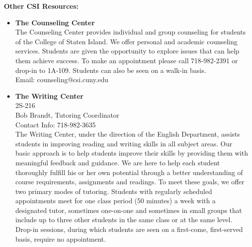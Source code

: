 \documentclass[11pt]{article}
\begin{document}
\textbf{Other CSI Resources:}
\begin{itemize}
    \item \textbf{The Counseling Center} \\
    The Counseling Center provides individual and group counseling for students of the College of Staten Island. We offer personal and academic counseling services. Students are given the opportunity to explore issues that can help them achieve success. To make an appointment please call 718-982-2391 or drop-in to 1A-109. Students can also be seen on a walk-in basis. \\ Email: counseling@csi.cuny.edu
     \item \textbf{The Writing Center} \\
     2S-216\\
     Bob Brandt, Tutoring Coordinator\\
     Contact Info: 718-982-3635\\
     The Writing Center, under the direction of the English Department, assists students in improving reading and writing skills in all subject areas. Our basic approach is to help students improve their skills by providing them with meaningful feedback and guidance. We are here to help each student thoroughly fulfill his or her own potential through a better understanding of course requirements, assignments and readings.
     To meet these goals, we offer two primary modes of tutoring. Students with regularly scheduled appointments meet for one class period (50 minutes) a week with a designated tutor, sometimes one-on-one and sometimes in small groups that include up to three other students in the same class or at the same level. Drop-in sessions, during which students are seen on a first-come, first-served basis, require no appointment.

\end{itemize}
\end{document}
